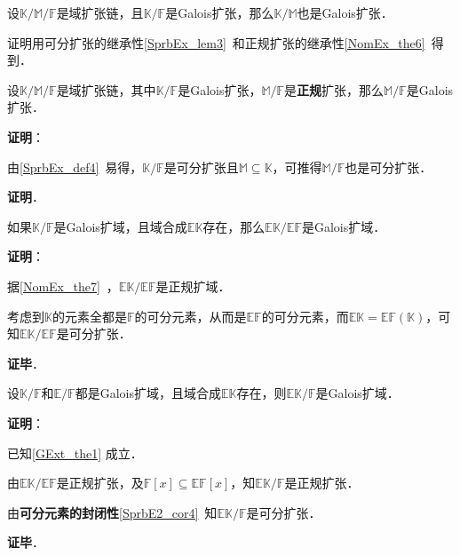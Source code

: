 \begin{theorem}{}\label{GExt_the6}
设$\mathbb{K}/\mathbb{M}/\mathbb{F}$是域扩张链，且$\mathbb{K}/\mathbb{F}$是Galois扩张，那么$\mathbb{K}/\mathbb{M}$也是Galois扩张．
\end{theorem}

证明用可分扩张的继承性\autoref{SprbEx_lem3}~和正规扩张的继承性\autoref{NomEx_the6}~得到．

\begin{theorem}{}\label{GExt_the5}
设$\mathbb{K}/\mathbb{M}/\mathbb{F}$是域扩张链，其中$\mathbb{K}/\mathbb{F}$是Galois扩张，$\mathbb{M}/\mathbb{F}$是\textbf{正规}扩张，那么$\mathbb{M}/\mathbb{F}$是Galois扩张．
\end{theorem}

\textbf{证明}：

由\autoref{SprbEx_def4}~易得，$\mathbb{K}/\mathbb{F}$是可分扩张且$\mathbb{M}\subseteq\mathbb{K}$，可推得$\mathbb{M}/\mathbb{F}$也是可分扩张．

\textbf{证明}．

\begin{theorem}{}\label{GExt_the1}
如果$\mathbb{K}/\mathbb{F}$是Galois扩域，且域合成$\mathbb{EK}$存在，那么$\mathbb{EK}/\mathbb{EF}$是Galois扩域．
\end{theorem}

\textbf{证明}：

据\autoref{NomEx_the7}~，$\mathbb{EK}/\mathbb{EF}$是正规扩域．

考虑到$\mathbb{K}$的元素全都是$\mathbb{F}$的可分元素，从而是$\mathbb{EF}$的可分元素，而$\mathbb{EK}=\mathbb{EF}(\mathbb{K})$，可知$\mathbb{EK}/\mathbb{EF}$是可分扩张．

\textbf{证毕}．



\begin{theorem}{}
设$\mathbb{K}/\mathbb{F}$和$\mathbb{E}/\mathbb{F}$都是Galois扩域，且域合成$\mathbb{EK}$存在，则$\mathbb{EK}/\mathbb{F}$是Galois扩域．
\end{theorem}

\textbf{证明}：

已知\autoref{GExt_the1} 成立．

由$\mathbb{EK}/\mathbb{EF}$是正规扩张，及$\mathbb{F}[x]\subseteq\mathbb{EF}[x]$，知$\mathbb{EK}/\mathbb{F}$是正规扩张．

由\textbf{可分元素的封闭性}\autoref{SprbE2_cor4}~知$\mathbb{EK}/\mathbb{F}$是可分扩张．

\textbf{证毕}．




